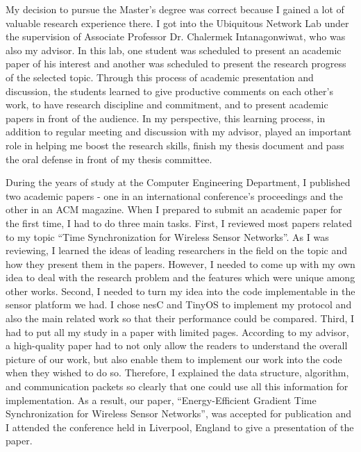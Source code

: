 \documentclass[a4paper]{report}
\begin{document}
\vspace{0.2cm}
My decision to pursue the Master's degree was correct because I gained a lot of valuable research experience there. I got into the Ubiquitous Network Lab under the supervision of Associate Professor Dr. Chalermek Intanagonwiwat, who was also my advisor. In this lab, one student was scheduled to present an academic paper of his interest and another was scheduled to present the research progress of the selected topic. Through this process of academic presentation and discussion, the students learned to give productive comments on each other's work, to have research discipline and commitment, and to present academic papers in front of the audience. In my perspective, this learning process, in addition to regular meeting and discussion with my advisor, played an important role in helping me boost the research skills, finish my thesis document and pass the oral defense in front of my thesis committee. 


\vspace{0.2cm}
During the years of study at the Computer Engineering Department, I published two academic papers - one in an international conference's proceedings and the other in an ACM magazine. When I prepared to submit an academic paper for the first time, I had to do three main tasks. First, I reviewed most papers related to my topic ``Time Synchronization for Wireless Sensor Networks''. As I was reviewing, I learned the ideas of leading researchers in the field on the topic and how they present them in the papers. However, I needed to come up with my own idea to deal with the research problem and the features which were unique among other works. Second, I needed to turn my idea into the code implementable in the sensor platform we had. I chose nesC and TinyOS to implement my protocol and also the main related work so that their performance could be compared. Third, I had to put all my study in a paper with limited pages. According to my advisor, a high-quality paper had to not only allow the readers to understand the overall picture of our work, but also enable them to implement our work into the code when they wished to do so. Therefore, I explained the data structure, algorithm, and communication packets so clearly that one could use all this information for implementation. As a result, our paper, ``Energy-Efficient Gradient Time Synchronization for Wireless Sensor Networks'', was accepted for publication and I attended the conference held in Liverpool, England to give a presentation of the paper.
\end{document}
